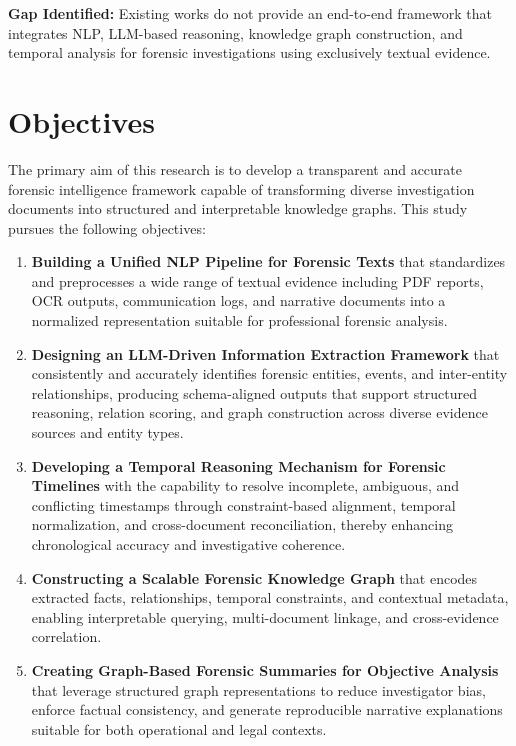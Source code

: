 \documentclass{ieeeaccess}
\begin{document}
\textbf{Gap Identified:} Existing works do not provide an end-to-end framework that integrates NLP, LLM-based reasoning, knowledge graph construction, and temporal analysis for forensic investigations using exclusively textual evidence.

\section{Objectives}

The primary aim of this research is to develop a transparent and accurate forensic intelligence framework capable of transforming diverse investigation documents into structured and interpretable knowledge graphs. This study pursues the following objectives:

\begin{enumerate}
    \item \textbf{Building a Unified NLP Pipeline for Forensic Texts} that standardizes and preprocesses a wide range of textual evidence including PDF reports, OCR outputs, communication logs, and narrative documents into a normalized representation suitable for professional forensic analysis.

    \item \textbf{Designing an LLM-Driven Information Extraction Framework} that consistently and accurately identifies forensic entities, events, and inter-entity relationships, producing schema-aligned outputs that support structured reasoning, relation scoring, and graph construction across diverse evidence sources and entity types.

    \item \textbf{Developing a Temporal Reasoning Mechanism for Forensic Timelines} with the capability to resolve incomplete, ambiguous, and conflicting timestamps through constraint-based alignment, temporal normalization, and cross-document reconciliation, thereby enhancing chronological accuracy and investigative coherence.

    \item \textbf{Constructing a Scalable Forensic Knowledge Graph} that encodes extracted facts, relationships, temporal constraints, and contextual metadata, enabling interpretable querying, multi-document linkage, and cross-evidence correlation.

    \item \textbf{Creating Graph-Based Forensic Summaries for Objective Analysis} that leverage structured graph representations to reduce investigator bias, enforce factual consistency, and generate reproducible narrative explanations suitable for both operational and legal contexts.
\end{enumerate}
\end{document}

